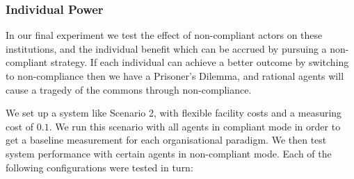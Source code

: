 





\subsubsection*{Individual Power}

In our final experiment we test the effect of non-compliant actors on these
institutions, and the individual benefit which can be accrued by pursuing a
non-compliant strategy. If each individual can achieve a better outcome by
switching to non-compliance then we have a Prisoner's Dilemma, and rational
agents will cause a tragedy of the commons through non-compliance. 

We set up a system like Scenario 2, with flexible facility costs and a
measuring cost of $0.1$. We run this scenario with all agents in compliant
mode in order to get a baseline measurement for each organisational paradigm.
We then test system performance with certain agents in non-compliant mode.
Each of the following configurations were tested in turn:

